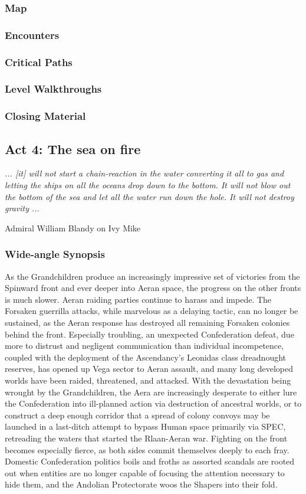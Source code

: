 \subsubsection{Map}
\subsubsection{Encounters}
\subsubsection{Critical Paths}
\subsubsection{Level Walkthroughs}
\subsubsection{Closing Material}

\subsection{Act 4: The sea on fire}
\begin{center}
{\it ... [it] will not start a chain-reaction in the water converting it all to gas and letting the ships on all the oceans drop down to the bottom. It will not blow out the bottom of the sea and let all the water run down the hole. It will not destroy gravity ... } 

Admiral William Blandy on Ivy Mike
\end{center}
\subsubsection{Wide-angle Synopsis}
As the Grandchildren produce an increasingly impressive set of
victories from the Spinward front and ever deeper into Aeran space,
the progress on the other fronts is much slower. Aeran raiding parties
continue to harass and impede. The Forsaken guerrilla attacks, while
marvelous as a delaying tactic, can no longer be sustained, as the
Aeran response has destroyed all remaining Forsaken colonies behind
the front. Especially troubling, an unexpected Confederation defeat,
due more to distrust and negligent communication than individual
incompetence, coupled with the deployment of the Ascendancy's Leonidas
class dreadnought reserves, has opened up Vega sector to Aeran
assault, and many long developed worlds have been raided, threatened,
and attacked. With the devastation being wrought by the Grandchildren,
the Aera are increasingly desperate to either lure the Confederation
into ill-planned action via destruction of ancestral worlds, or to
construct a deep enough corridor that a spread of colony convoys may
be launched in a last-ditch attempt to bypass Human space primarily
via SPEC, retreading the waters that started the Rlaan-Aeran
war. Fighting on the front becomes especially fierce, as both sides
commit themselves deeply to each fray. Domestic Confederation politics
boils and froths as assorted scandals are rooted out when entities are
no longer capable of focusing the attention necessary to hide them,
and the Andolian Protectorate woos the Shapers into their fold.
